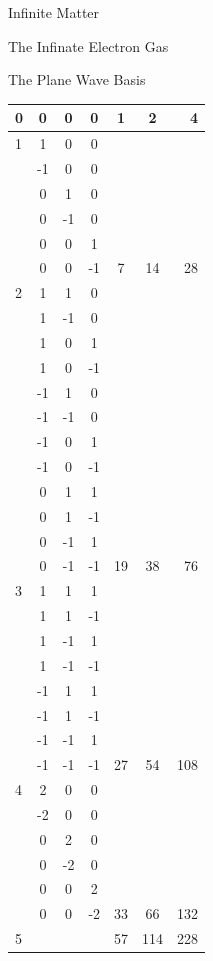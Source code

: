\documentclass[twoside,english]{uiofysmaster}
\begin{document}
\begin{chapter}{Infinite Matter}
\begin{section}{The Infinate Electron Gas}
\begin{subsection}{The Plane Wave Basis}
\begin{table}[H]
\begin{center}
\begin{tabular}[center]{l | c c c | c | c | r }
						\hline
						0 & 0 & 0 & 0 & 1 & 2 & 4 \\
						\hline
						1 & 1 & 0 & 0 &   &   &   \\
						  & -1& 0 & 0 &   &   &   \\
						  & 0 & 1 & 0 &   &   &   \\
						  & 0 & -1& 0 &   &   &   \\
						  & 0 & 0 & 1 &   &   &   \\
						  & 0 & 0 & -1& 7 & 14& 28\\
						\hline
						2 & 1 & 1 & 0 &   &   &   \\
						  & 1 & -1& 0 &   &   &   \\
						  & 1 & 0 & 1 &   &   &   \\
						  & 1 & 0 & -1&   &   &   \\
						  & -1& 1 & 0 &   &   &   \\
						  & -1& -1& 0 &   &   &   \\
						  & -1& 0 & 1 &   &   &   \\
						  & -1& 0 & -1&   &   &   \\
						  & 0 & 1 & 1 &   &   &   \\
						  & 0 & 1 & -1&   &   &   \\
						  & 0 & -1& 1 &   &   &   \\
						  & 0 & -1& -1&19 &38 & 76\\
						\hline
						3 & 1 & 1 & 1 &   &   &   \\
						  & 1 & 1 & -1&   &   &   \\
						  & 1 & -1& 1 &   &   &   \\
						  & 1 & -1& -1&   &   &   \\
						  & -1& 1 & 1 &   &   &   \\
						  & -1& 1 & -1&   &   &   \\
						  & -1& -1& 1 &   &   &   \\
						  & -1& -1& -1&27 & 54&108\\
						\hline
						4 & 2 & 0 & 0 &   &   &   \\
						  & -2& 0 & 0 &   &   &   \\
						  & 0 & 2 & 0 &   &   &   \\
						  & 0 & -2& 0 &   &   &   \\
						  & 0 & 0 & 2 &   &   &   \\
						  & 0 & 0 & -2& 33& 66&132\\
						\hline
						5 &   &   &   & 57&114&228\\

\end{tabular}
\end{center}
\end{table}
\end{subsection}
\end{section}
\end{chapter}
\end{document}
